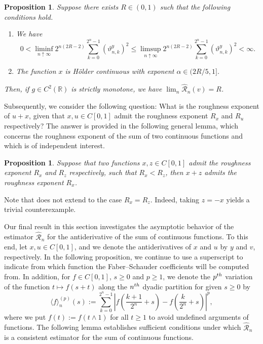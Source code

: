 \documentclass[12pt,reqno]{article}
\def\ua{\uparrow}
\def\wh{\widehat}
\numberwithin{equation}{section}
\def\cR{{\mathscr R}}
\newtheorem{proposition}[theorem]{Proposition}
\theoremstyle{definition}
\def\<{\langle}
\def\>{\rangle}
\def\ua{\uparrow}
\def\wh{\widehat}
\newcommand{\bR}{\mathbb{R}}
\begin{document}
\begin{proposition}\label{Prop tilde H z} Suppose there exists ${R}\in(0,1)$ such that the following conditions hold.
\begin{enumerate}
\item \label{Prop tilde H z part a}We have  
	\begin{equation}\label{Prop tilde H z a assumption eq}
	0< \liminf_{n \ua \infty}2^{n(2{R}-2)}\sum_{k = 0}^{2^n-1}\left(\vartheta^y_{n,k}\right)^2\le \limsup_{n \ua \infty}2^{n(2{R}-2)}\sum_{k = 0}^{2^{n}-1}\left(\vartheta^y_{n,k}\right)^2<\infty.
	\end{equation}
	
\item\label{Prop tilde H z part b}  The function $x$ is H\"older continuous with exponent $\alpha\in(2{R}/5,1]$. 
\end{enumerate}
Then, if $g\in C^2(\bR)$ is strictly monotone,  we have $\lim_n\wh\cR_n(v)={R}$.
\end{proposition}

Subsequently, we consider the following question: What is the roughness exponent of $u + x$, given that $x, u \in C[0,1]$ admit the roughness exponent $R_x$ and $R_u$ respectively? The answer is provided in the following general lemma, which concerns the roughness exponent of the sum of two continuous functions and which is of independent interest. 

\begin{proposition}\label{lemma roughness sum}
	Suppose that two functions $x,z \in C[0,1]$ admit the roughness exponent $R_x$ and $R_{z}$ respectively, such that $R_x < R_{z}$, then $x+z$ admits the roughness exponent $R_x$. 
\end{proposition}

Note that  does not extend to the case $R_x=R_{z}$. Indeed, taking $z=-x$ yields a trivial counterexample.


Our final result in this section investigates the asymptotic behavior of the estimator $\wh \cR_n$ for the antiderivative of the sum of continuous functions. To this end, let $x,u \in C[0,1]$, and we denote the antiderivatives of $x$ and $u$ by $y$ and $v$, respectively. In the following proposition, we continue to use a superscript to indicate from which function the Faber--Schauder coefficients will be computed from. In addition, for $f \in C[0,1]$,  $s \ge 0$ and $p \ge 1$, we denote the $p^{\rm th}$ variation of the function $t \mapsto f(s+t)$ along the $n^{\rm th}$ dyadic partition for given $s \ge 0$ by
\begin{equation}\label{eq p variation s}
	\<f\>^{(p)}_n(s):= \sum_{k = 0}^{2^n-1}\left|f\left(\frac{k+1}{2^{n}}+s\right)-f\left(\frac{k}{2^{n}}+s\right)\right|^p,
\end{equation}
where we put $f(t):= f(t \wedge 1)$ for all $t \ge 1$ to avoid undefined arguments of functions.
The following lemma establishes sufficient conditions under which $\wh \cR_n$ is a consistent estimator for the sum of continuous functions.
\end{document}
